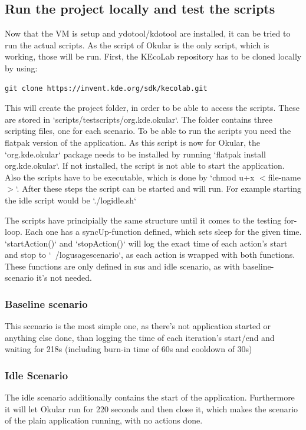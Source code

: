     \subsection{Run the project locally and test the scripts}
    Now that the VM is setup and ydotool/kdotool are installed, it can be tried to run the actual scripts. As the script of Okular is the only script, which is working, those will be run. First, the KEcoLab repository has to be cloned locally by using:
    \begin{lstlisting}[gobble=8]
        git clone https://invent.kde.org/sdk/kecolab.git
    \end{lstlisting}
    This will create the project folder, in order to be able to access the scripts. These are stored in `scripts/test\textunderscore scripts/org.kde.okular`. The folder contains three scripting files, one for each scenario.
    To be able to run the scripts you need the flatpak version of the application. As this script is now for Okular, the `org.kde.okular` package
    needs to be installed by running `flatpak install org.kde.okular`.
    If not installed, the script is not able to start the application.
    Also the scripts have to be executable, which is done by `chmod u+x $<$file-name$>$`. After these steps the script can be started and will run.
    For example starting the idle script would be `./log\textunderscore idle.sh`

    The scripts have principially the same structure until it comes to the testing for-loop. Each one has a syncUp-function defined, which sets sleep for the given time.
    `startAction()` and `stopAction()` will log the exact time of each action's start and stop to `~/log\textunderscore usage\textunderscore scenario`, as each action is wrapped with both functions. These functions are only defined in sus and idle scenario, as with baseline-scenario it's not needed.

    \subsubsection{Baseline scenario}
    This scenario is the most simple one, as there's not application started or anything else done, than logging the time of each iteration's start/end and waiting for 218s (including burn-in time of 60s and cooldown of 30s)

    \subsubsection{Idle Scenario}
    The idle scenario additionally contains the start of the application. Furthermore it will let Okular run for 220 seconds and then close it, which makes the scenario of the plain application running, with no actions done.

